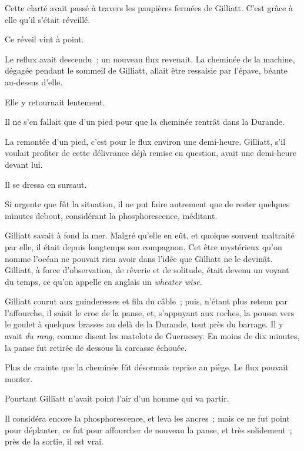 \documentclass[french,twoside]{book} %
\begin{document}
Cette clarté avait passé à travers les paupières fermées de Gilliatt. C’est grâce à elle qu’il s’était réveillé.\par
 Ce réveil vint à point.\par
Le reflux avait descendu ; un nouveau flux revenait. La cheminée de la machine, dégagée pendant le sommeil de Gilliatt, allait être ressaisie par l’épave, béante au-dessus d’elle.\par
Elle y retournait lentement.\par
Il ne s’en fallait que d’un pied pour que la cheminée rentrât dans la Durande.\par
La remontée d’un pied, c’est pour le flux environ une demi-heure. Gilliatt, s’il voulait profiter de cette délivrance déjà remise en question, avait une demi-heure devant lui.\par
Il se dressa en sursaut.\par
Si urgente que fût la situation, il ne put faire autrement que de rester quelques minutes debout, considérant la phosphorescence, méditant.\par
Gilliatt savait à fond la mer. Malgré qu’elle en eût, et quoique souvent maltraité par elle, il était depuis longtemps son compagnon. Cet être mystérieux qu’on nomme l’océan ne pouvait rien avoir dans l’idée que Gilliatt ne le devinât. Gilliatt, à force d’observation, de rêverie et de solitude, était devenu un voyant du temps, ce qu’on appelle en anglais un \emph{wheater wise.}\par
Gilliatt courut aux guinderesses et fila du câble ; puis, n’étant plus retenu par l’affourche, il saisit le croc de la panse, et, s’appuyant aux roches, la poussa vers le goulet à quelques brasses au delà de la Durande, tout près du barrage. Il y avait \emph{du rang,} comme disent les matelots de Guernesey. En moins de dix minutes, la panse fut retirée de dessous la carcasse échouée.\par
 Plus de crainte que la cheminée fût désormais reprise au piège. Le flux pouvait monter.\par
Pourtant Gilliatt n’avait point l’air d’un homme qui va partir.\par
Il considéra encore la phosphorescence, et leva les ancres ; mais ce ne fut point pour déplanter, ce fut pour affourcher de nouveau la panse, et très solidement ; près de la sortie, il est vrai.\par
\end{document}
